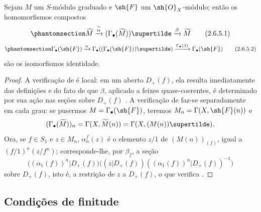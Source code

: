 \documentclass[oneside,10pt]{amsart}
\let\EGAOriginalLabel\label
\renewcommand{\label}[1]{\phantomsection\EGAOriginalLabel{#1}}
\begin{document}
\begin{proposition}[2.6.5]
\label{II.2.6.5}
Sejam $M$ um $S$-módulo graduado e $\sh{F}$ um $\sh{O}_X$-módulo; então os homomorfismos compostos
\[
\label{II.2.6.5.1}
  \widetilde{M}
  \xrightarrow{\widetilde{\alpha}}(\Gamma_\bullet(\widetilde{M}))\supertilde
  \xrightarrow{\beta}\widetilde{M}
\tag{2.6.5.1}
\]
\[
\label{II.2.6.5.2}
  \Gamma_\bullet(\sh{F})
  \xrightarrow{\alpha}\Gamma_\bullet((\Gamma_\bullet(\sh{F}))\supertilde)
  \xrightarrow{\Gamma_\bullet(\beta)}\Gamma_\bullet(\sh{F})
\tag{2.6.5.2}
\]
são os isomorfismos identidade.
\end{proposition}

\begin{proof}
A verificação de  é local: em um aberto $D_+(f)$, ela resulta imediatamente das definições e do fato de que $\beta$, aplicado a feixes quase-coerentes, é determinado por sua ação nas seções sobre $D_+(f)$ .
A verificação de  faz-se separadamente em cada grau: se pusermos $M=\Gamma_\bullet(\sh{F})$, teremos $M_n=\Gamma(X,\sh{F}(n))$ e
\[
  (\Gamma_\bullet(\widetilde{M}))_n
  =\Gamma(X,\widetilde{M}(n))
  =\Gamma(X,(M(n))\supertilde).
\]
Ora, se $f\in S_1$ e $z\in M_n$, $\alpha_n^f(z)$ é o elemento $z/1$ de $(M(n))_{(f)}$, igual a $(f/1)^n(z/f^n)$; corresponde-lhe, por $\beta_f$, a seção
\[
  \Big((\alpha_1(f))^n|D_+(f)\Big)
  \Big((z|D_+(f))((\alpha_1(f))^n|D_+(f))^{-1}\Big)
\]
sobre $D_+(f)$, isto é, a restrição de $z$ a $D_+(f)$, o que verifica .
\end{proof}

\subsection{Condições de finitude}
\label{subsection:II.2.7}
\end{document}
